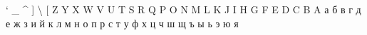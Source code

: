 \documentclass{article}%
\begin{document}
%
\normalsize%
\noindent%
` \_ \^{} {]} \textbackslash{} {[} Z Y X W V U T S R Q P O N M L K J I H G F E D C B A а б в г д е ж з и й к л м н о п р с т у ф х ц ч ш щ ъ ы ь э ю я%
\end{document}
